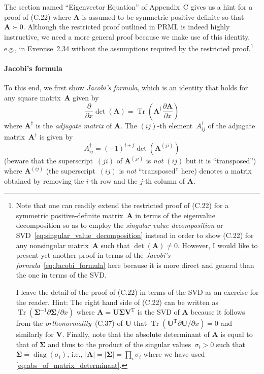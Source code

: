 \documentclass[12pt,a4paper]{article}
\newcommand{\parhead}[1]{%
\paragraph{#1}
\addcontentsline{toc}{subsubsection}{#1}}
\begin{document}
The section named ``Eigenvector Equation'' of Appendix~C gives us a hint for a proof of (C.22)
where $\mathbf{A}$ is assumed to be symmetric positive definite so that $\mathbf{A} \succ 0$.
Although the restricted proof outlined in PRML is indeed highly instructive,
we need a more general proof because we make use of this identity, e.g., in Exercise~2.34
without the assumptions required by the restricted proof.\footnote{%
Note that one can readily extend
the restricted proof of (C.22) for a symmetric positive-definite matrix~$\mathbf{A}$
in terms of the eigenvalue decomposition
so as to employ the \emph{singular value decomposition} or
SVD~\eqref{eq:singular_value_decomposition} instead
in order to show (C.22) for any nonsingular matrix~$\mathbf{A}$
such that $\operatorname{det}(\mathbf{A}) \neq 0$.
However, I would like to present yet another proof
in terms of the \emph{Jacobi's formula}~\eqref{eq:Jacobi_formula} here
because it is more direct and general than the one in terms of the SVD.

I leave the detail of the proof of (C.22) in terms of the SVD as an exercise for the reader.
Hint: The right hand side of (C.22) can be written as
$\operatorname{Tr}\left(\bm{\Sigma}^{-1}\partial\bm{\Sigma}/\partial x\right)$
where $\mathbf{A} = \mathbf{U}\bm{\Sigma}\mathbf{V}^{\operatorname{T}}$ is the SVD of $\mathbf{A}$
because it follows from the \emph{orthonormality}~(C.37) of $\mathbf{U}$ that
$\operatorname{Tr}(\mathbf{U}^{\operatorname{T}}\partial\mathbf{U}/\partial x) = 0$
and similarly for $\mathbf{V}$.
Finally, note that the absolute determinant of $\mathbf{A}$ is equal to that of $\bm{\Sigma}$ and
thus to the product of the singular values~$\sigma_i > 0$ such that
$\bm{\Sigma} = \operatorname{diag}\left( \sigma_i \right)$, i.e.,
$\left|\mathbf{A}\right| = \left|\bm{\Sigma}\right| = \prod_i \sigma_i$
where we have used \eqref{eq:abs_of_matrix_determinant}.}

\parhead{Jacobi's formula}
To this end, we first show \emph{Jacobi's formula},
which is an identity that holds for any square matrix~$\mathbf{A}$ given by
\begin{equation}
\frac{\partial}{\partial x} \operatorname{det}\left(\mathbf{A}\right) =
\operatorname{Tr}\left(\mathbf{A}^{\dagger}\frac{\partial\mathbf{A}}{\partial x}\right)
\label{eq:Jacobi_formula}
\end{equation}
where $\mathbf{A}^{\dagger}$ is the \emph{adjugate matrix} of
$\mathbf{A}$.
The $(ij)$-th element~$A_{ij}^{\dagger}$ of the adjugate matrix~$\mathbf{A}^{\dagger}$ is given by
\begin{equation}
A_{ij}^{\dagger} = (-1)^{i+j} \operatorname{det}\left(\mathbf{A}^{(ji)}\right)
\label{eq:definition_of_adjugate}
\end{equation}
(beware that the superscript~$(ji)$ of $\mathbf{A}^{(ji)}$ is \emph{not} $(ij)$ but
it is ``transposed'')
where $\mathbf{A}^{(ij)}$ (the superscript~$(ij)$ is \emph{not} ``transposed'' here)
denotes a matrix obtained by removing
the $i$-th row and the $j$-th column of $\mathbf{A}$.
\end{document}
